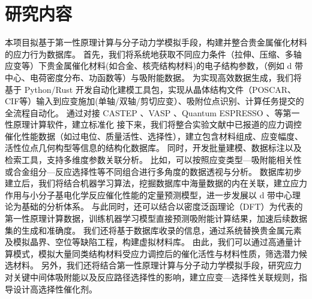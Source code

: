 \providecommand{\bibauthor}[1]{#1}
\providecommand{\bibeditor}[1]{#1}
\providecommand{\bibtranslator}[1]{#1}
\providecommand{\bibtitle}[1]{#1}
\providecommand{\bibbooktitle}[1]{#1}
\providecommand{\bibjournal}[1]{#1}
\providecommand{\bibmark}[1]{#1}
\providecommand{\bibcountry}[1]{#1}
\providecommand{\bibpatentid}[1]{#1}
\providecommand{\bibedition}[1]{#1}
\providecommand{\biborganization}[1]{#1}
\providecommand{\bibaddress}[1]{#1}
\providecommand{\bibpublisher}[1]{#1}
\providecommand{\bibinstitution}[1]{#1}
\providecommand{\bibschool}[1]{#1}
\providecommand{\bibvolume}[1]{#1}
\providecommand{\bibnumber}[1]{#1}
\providecommand{\bibversion}[1]{#1}
\providecommand{\bibpages}[1]{#1}
\providecommand{\bibmodifydate}[1]{#1}
\providecommand{\bibcitedate}[1]{#1}
\providecommand{\bibyear}[1]{#1}
\providecommand{\bibdate}[1]{#1}
\providecommand{\biburl}[1]{\newline\url{#1}}
\section{研究内容}

本项目拟基于第一性原理计算与分子动力学模拟手段，构建并整合贵金属催化材料的应力行为数据库。
首先，我们将系统地获取不同应力条件（拉伸、压缩、多轴应变等）下贵金属催化材料(如合金、核壳结构材料)的电子结构参数，（例如 d 带中心、电荷密度分布、功函数等）与吸附能数据。
为实现高效数据生成，我们将基于 Python/Rust 开发自动化建模工具包，实现从晶体结构文件（POSCAR、CIF等）输入到应变施加(单轴/双轴/剪切应变）、吸附位点识别、计算任务提交的全流程自动化。
通过对接 CASTEP 、VASP 、Quantum ESPRESSO 、等第一性原理计算软件，建立标准化 
接下来，我们将整合实验文献中已报道的应力调控催化性能数据（如过电位、质量活性、选择性），建立包含材料组成、应变幅度、活性位点几何构型等信息的结构化数据库。
同时，开发批量建模、数据标注以及检索工具，支持多维度参数关联分析。
比如，可以按照应变类型—吸附能相关性或合金组分—反应选择性等不同组合进行多角度的数据透视与分析。
数据库初步建立后，我们将结合机器学习算法，挖掘数据库中海量数据的内在关联，建立应力作用与小分子基电化学反应催化性能的定量预测模型，进一步发展以 d 带中心理论为基础的分析体系。
与此同时，还可以结合以密度泛函理论（DFT）为代表的第一性原理计算数据，训练机器学习模型直接预测吸附能计算结果，加速后续数据集的生成和准确度。
我们还将基于数据库收录的信息，通过系统替换贵金属元素及模拟晶界、空位等缺陷工程，构建虚拟材料库。
由此，我们可以通过高通量计算模式，模拟大量同类结构材料受应力调控后的催化活性与材料性质，筛选潜力候选材料。
另外，我们还将结合第一性原理计算与分子动力学模拟手段，研究应力对关键中间体吸附能以及反应路径选择性的影响，建立应变—选择性关联规则，指导设计高选择性催化剂。


